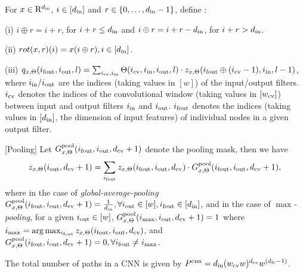\begin{definition}
For $x\in\mathrm{R}^{d_{\text{in}}}$, $i\in[d_{\text{in}}]$ and $r\in\{0,\ldots,d_{\text{in}}-1\}$, define :

(i) $i\oplus r = i+r$, for $i+r \leq d_{\text{in}}$ and $i\oplus r =i+r-d_{\text{in}}$, for $i+r>d_{\text{in}}$.

(ii) $rot(x,r)(i)=x(i\oplus r), i\in[d_{\text{in}}]$.

(iii) $q_{x,\Theta}(i_{\text{fout}},i_{\text{out}},l)=\sum_{i_{\text{cv}},i_{\text{in}}}\Theta(i_{\text{cv}},i_{\text{in}},i_{\text{out}},l)\cdot z_{x,\Theta}(i_{\text{fout}}\oplus (i_{\text{cv}}-1),i_{\text{in}},l-1)$, where $i_{\text{in}}/i_{\text{out}}$ are the indices (taking values in $[w]$) of the input/output filters. $i_{\text{cv}}$ denotes the indices of the convolutional window (taking values in $[w_{\text{cv}}]$) between input and output filters $i_{\text{in}}$ and $i_{\text{out}}$. $i_{\text{fout}}$ denotes the indices (taking values in $[d_{\text{in}}]$, the dimension of input features) of individual nodes in a given output filter.
\end{definition}
\begin{definition}\label{def:pooling}[Pooling]
Let $G^{\text{pool}}_{x,\Theta}(i_{\text{fout}},i_{\text{out}},d_{\text{cv}}+1)$ denote the pooling mask, then we have
\begin{align*}
z_{x,\Theta}(i_{\text{out}}, d_{\text{cv}}+1) =\sum_{i_{\text{fout}}} z_{x,\Theta}(i_{\text{fout}},i_{\text{out}},d_{\text{cv}})\cdot G^{\text{pool}}_{x,\Theta}(i_{\text{fout}},i_{\text{out}},d_{\text{cv}}+1),
\end{align*}
where in the case of \emph{global-average-pooling} $G^{\text{pool}}_{x,\Theta}(i_{\text{fout}},i_{\text{out}},d_{\text{cv}}+1)=\frac{1}{d_{\text{in}}},\forall i_{\text{out}}\in[w], i_{\text{fout}}\in[d_{\text{in}}]$, and in the case of \emph{$\max$-pooling},  
for a given $i_{\text{out}}\in[w]$, $G^{\text{pool}}_{x,\Theta}(i_{\max},i_{\text{out}},d_{\text{cv}}+1)=1$ where $i_{\max}=\arg\max_{i_{\text{fout}}}z_{x,\Theta}(i_{\text{fout}},i_{\text{out}},d_{\text{cv}})$, and $G^{\text{pool}}_{x,\Theta}(i_{\text{fout}},i_{\text{out}},d_{\text{cv}}+1)=0,\forall i_{\text{fout}}\neq i_{\max}$.
\end{definition}

\begin{proposition}
The total number of paths in a CNN is given by  $P^{\text{cnn}}=d_{\text{in}}(w_{\text{cv}} w)^{d_{\text{cv}}}w^{(d_{\text{fc}}-1)}$.
\end{proposition}

